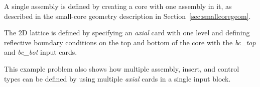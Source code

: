 \documentclass{vera-ornltm}
\begin{document}
A single assembly is defined by creating a core with one assembly in it,
as described in the small-core geometry description in Section~\ref{sec:smallcoregeom}.

The 2D lattice is defined by specifying an {\it axial} card with one level and defining
reflective boundary conditions on the top and bottom of the core with the {\it bc\_top} and {\it bc\_bot}
input cards.

This example problem also shows how multiple assembly, insert, and control types can be
defined by using multiple {\it axial} cards in a single input block.






\end{document}
